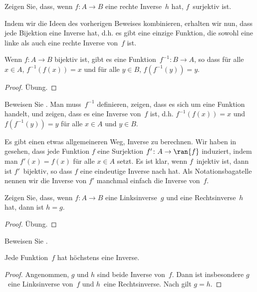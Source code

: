 \documentclass[../../../include/open-logic-section]{subfiles}
\begin{document}
\begin{prob}
Zeigen Sie, dass, wenn $f\colon A \to B$ eine rechte Inverse~$h$ hat, $f$~surjektiv ist.
\end{prob}

\begin{explain}
  Indem wir die Ideen des vorherigen Beweises kombinieren, erhalten wir nun, dass jede
  Bijektion eine Inverse hat, d.h. es gibt eine einzige Funktion,
  die sowohl eine linke als auch eine rechte Inverse von~$f$ ist.
\end{explain}

\begin{prop}
Wenn $f\colon A \to B$ bijektiv ist, gibt es eine
Funktion~$f^{-1}\colon B \to A$, so dass für alle $x \in A$,
$f^{-1}(f(x)) = x$ und für alle $y \in B$, $f(f^{-1}(y)) = y$.
\end{prop}

\begin{proof}
Übung.
\end{proof}

\begin{prob}
Beweisen Sie . Man muss~$f^{-1}$ definieren,
zeigen, dass es sich um eine Funktion handelt, und zeigen, dass es eine
Inverse von~$f$ ist, d.h. $f^{-1}(f(x)) = x$ und $f(f^{-1}(y)) = y$ für
alle $x \in A$ und $y \in B$.
\end{prob}

\begin{explain}
Es gibt einen etwas allgemeineren Weg, Inverse zu berechnen. Wir haben in
 gesehen, dass jede Funktion $f$ eine Surjektion $f'
\colon A \to \ran{f}$ induziert, indem man $f'(x) = f(x)$ für alle $x \in A$ setzt.
Es ist klar, wenn $f$~injektiv ist, dann ist $f'$~bijektiv, so dass
$f$ eine eindeutige Inverse nach  hat.
Als Notationsbagatelle nennen wir die Inverse von $f'$ manchmal einfach
\glqq die Inverse von~$f$.\grqq{}
\end{explain}

\begin{prop}%
  Zeigen Sie, dass, wenn $f\colon A \to B$ eine Linksinverse~$g$ und eine Rechtsinverse~$h$ hat,
  dann ist $h = g$.
\end{prop}

\begin{proof}
  Übung.
\end{proof}

\begin{prob}
  Beweisen Sie .
\end{prob}

\begin{prop}
Jede Funktion~$f$ hat höchstens eine Inverse.
\end{prop}

\begin{proof}
  Angenommen, $g$ und $h$ sind beide Inverse von~$f$. Dann ist insbesondere
  $g$~eine Linksinverse von~$f$ und $h$~eine Rechtsinverse. Nach
   gilt $g = h$.
\end{proof}
\end{document}
